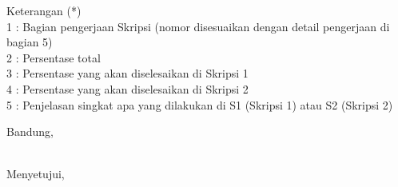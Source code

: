 \documentclass[a4paper,twoside]{article}
\begin{document}
Keterangan (*)\\
1 : Bagian pengerjaan Skripsi (nomor disesuaikan dengan detail pengerjaan di bagian 5)\\
2 : Persentase total \\
3 : Persentase yang akan diselesaikan di Skripsi 1 \\
4 : Persentase yang akan diselesaikan di Skripsi 2 \\
5 : Penjelasan singkat apa yang dilakukan di S1 (Skripsi 1) atau S2 (Skripsi 2)

\vspace{1cm}
\centering Bandung, \tanggal\\
\vspace{2cm} \nama \\ 
\vspace{1cm}

Menyetujui, \\
\end{document}
